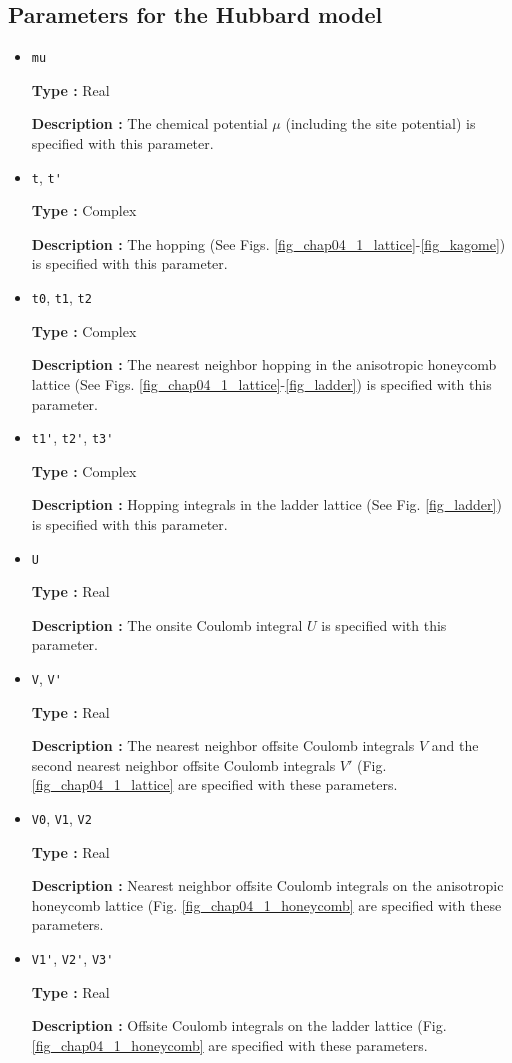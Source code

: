\subsection{Parameters for the Hubbard model}
\begin{itemize}
\item \verb|mu|

{\bf Type :} Real

{\bf Description :} The chemical potential $\mu$ (including the site potential)
is specified with this parameter.

\item \verb|t|, \verb|t'|

{\bf Type :} Complex

{\bf Description :} The hopping (See Figs. \ref{fig_chap04_1_lattice}-\ref{fig_kagome})
is specified with this parameter.

\item \verb|t0|, \verb|t1|, \verb|t2|

{\bf Type :} Complex

{\bf Description :} The nearest neighbor hopping 
in the anisotropic honeycomb lattice 
(See Figs. \ref{fig_chap04_1_lattice}-\ref{fig_ladder})
is specified with this parameter.

\item \verb|t1'|,  \verb|t2'|, \verb|t3'|

{\bf Type :} Complex

{\bf Description :} Hopping integrals
in the ladder lattice 
(See Fig. \ref{fig_ladder})
is specified with this parameter.

\item \verb|U|

{\bf Type :} Real

{\bf Description :} The onsite Coulomb integral $U$ is specified with this parameter.

\item \verb|V|, \verb|V'|

{\bf Type :} Real

{\bf Description :} The nearest neighbor offsite Coulomb integrals $V$
and the second nearest neighbor offsite Coulomb integrals $V'$
(Fig. \ref{fig_chap04_1_lattice} are specified with these parameters.

\item \verb|V0|, \verb|V1|, \verb|V2|

{\bf Type :} Real

{\bf Description :} Nearest neighbor offsite Coulomb integrals 
on the anisotropic honeycomb lattice
(Fig. \ref{fig_chap04_1_honeycomb} are specified with these parameters.

\item \verb|V1'|, \verb|V2'|, \verb|V3'|

{\bf Type :} Real

{\bf Description :} Offsite Coulomb integrals 
on the ladder lattice
(Fig. \ref{fig_chap04_1_honeycomb} are specified with these parameters.

\end{itemize}

